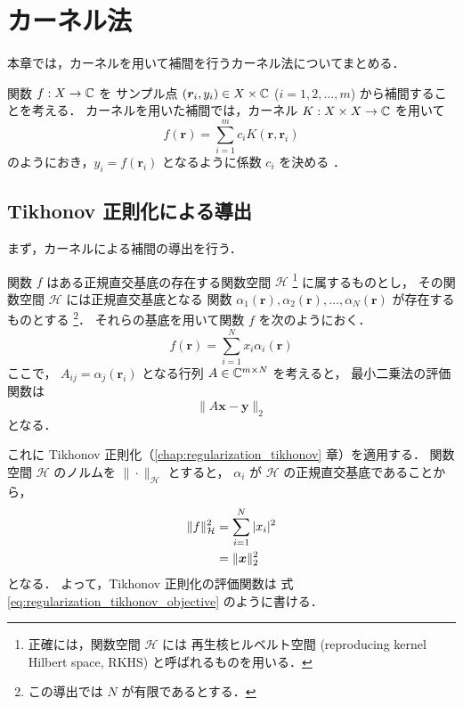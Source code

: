 %

\chapter{カーネル法}

本章では，カーネルを用いて補間を行うカーネル法についてまとめる．

関数 $f : X \to \mathbb{C}$ を
サンプル点 $(\bm{r}_i, y_i) \in X \times \mathbb{C}$ ($i = 1, 2, \ldots, m$) から補間することを考える．
カーネルを用いた補間では，カーネル $K : X \times X \to \mathbb{C}$ を用いて
\begin{equation}
    f(\bm{r}) = \sum_{i=1}^m c_i K(\bm{r}, \bm{r}_i)
\end{equation}
のようにおき，$y_i = f(\bm{r}_i)$ となるように係数 $c_i$ を決める
\cite{Fukumizu2010}．

\section{Tikhonov 正則化による導出}

まず，カーネルによる補間の導出を行う．

関数 $f$ はある正規直交基底の存在する関数空間 $\mathcal{H}$
\footnote{正確には，関数空間 $\mathcal{H}$ には%
    再生核ヒルベルト空間 (reproducing kernel Hilbert space, RKHS)%
    と呼ばれるものを用いる．}
に属するものとし，
その関数空間 $\mathcal{H}$ には正規直交基底となる
関数 $\alpha_1(\bm{r}), \alpha_2(\bm{r}), \ldots, \alpha_N(\bm{r})$ が存在するものとする
\footnote{この導出では $N$ が有限であるとする．}．
それらの基底を用いて関数 $f$ を次のようにおく．
\begin{equation}
    f(\bm{r}) = \sum_{i = 1}^{N} x_i \alpha_i(\bm{r})
\end{equation}
ここで，
$A_{ij} = \alpha_j(\bm{r}_i)$ となる行列 $A \in \mathbb{C}^{m \times N}$ を考えると，
最小二乗法の評価関数は
\begin{equation}
    \|A \bm{x} - \bm{y}\|_2
\end{equation}
となる．

これに Tikhonov 正則化（\ref{chap:regularization_tikhonov} 章）を適用する．
関数空間 $\mathcal{H}$ のノルムを $\|\cdot\|_{\mathcal{H}}$ とすると，
$\alpha_i$ が $\mathcal{H}$ の正規直交基底であることから，
\begin{align}
    \|f\|_{\mathcal{H}}^2
     & = \sum_{i = 1}^{N} |x_i|^2 \notag \\
     & = \|\bm{x}\|_2^2
\end{align}
となる．
よって，Tikhonov 正則化の評価関数は
式 \eqref{eq:regularization_tikhonov_objective} のように書ける．

